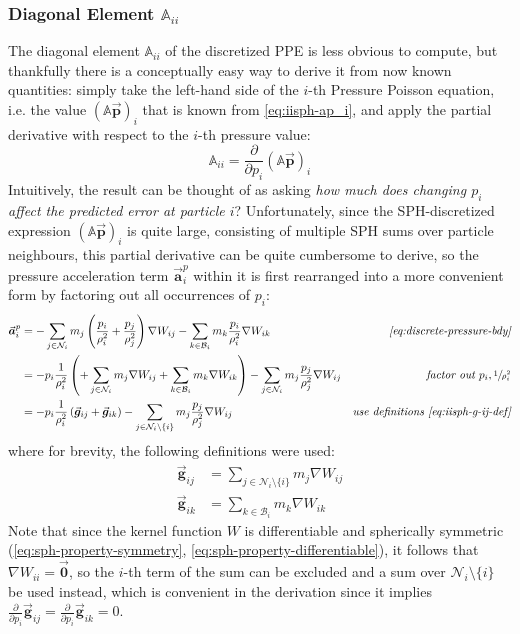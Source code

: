 \documentclass[oneside, a4paper]{book}
\newcommand\pdpi[0]{\frac{\partial}{\partial p_i}}
\newcommand\vek[1]{\vec{\bm{#1}}}
\newcommand\br[1]{\left(#1\right)}
\begin{document}
    \subsubsection{Diagonal Element $\mathds{A}_{ii}$}\label{subsec:diagonal-element}
    The diagonal element $\mathds{A}_{ii}$ of the discretized PPE is less obvious to compute, but thankfully there is a conceptually easy way to derive it from now known quantities: simply take the left-hand side of the $i$-th Pressure Poisson equation, i.e. the value $\br{\mathds{A}\vek{p}}_i$ that is known from \autoref{eq:iisph-ap_i}, and apply the partial derivative with respect to the $i$-th pressure value:
    \begin{equation}
      \mathds{A}_{ii} = \pdpi \br{\mathds{A}\vek{p}}_i
    \end{equation}
    Intuitively, the result can be thought of as asking \textit{how much does changing $p_i$ affect the predicted error at particle $i$}? Unfortunately, since the SPH-discretized expression $\br{\mathds{A}\vek{p}}_i$ is quite large, consisting of multiple SPH sums over particle neighbours, this partial derivative can be quite cumbersome to derive, so the pressure acceleration term $\vek{a}_i^p$ within it is first rearranged into a more convenient form by factoring out all occurrences of $p_i$:
    \begin{align}
      \vek{a}_i^p &= -
      \sum_{j\in\mathcal{N}_i} 
        m_j \br{\frac{p_i}{\rho_i^2} + \frac{p_j}{\rho_j^2}} \nabla W_{ij} 
      -\sum_{k\in\mathcal{B}_i} 
        m_k\frac{p_i}{\rho_i^2} \nabla W_{ik} 
      &\textit{\autoref{eq:discrete-pressure-bdy}}\\
      &= -p_i \frac{1}{\rho_i^2}\br{
        +\sum_{j\in\mathcal{N}_i} 
        m_j \nabla W_{ij} 
        +\sum_{k\in\mathcal{B}_i} 
        m_k \nabla W_{ik} 
      }
      - \sum_{j\in\mathcal{N}_i} 
        m_j\frac{p_j}{\rho_j^2} \nabla W_{ij} 
      &\textit{factor out $p_i, \sfrac{1}{\rho_i^2}$}\\
      \label{eq:iisph-a-i}
      &= -p_i \frac{1}{\rho_i^2}\br{
        \vek{g}_{ij}
        +\vek{g}_{ik}
      }
      - \sum_{j\in\mathcal{N}_i\setminus \{i\}} 
        m_j\frac{p_j}{\rho_j^2} \nabla W_{ij} 
      &\textit{use definitions \autoref{eq:iisph-g-ij-def}}
    \end{align}
    where for brevity, the following definitions were used:
    \begin{align}
      \vek{g}_{ij} &= \sum_{j\in\mathcal{N}_i\setminus \{i\}}m_j \nabla W_{ij}\label{eq:iisph-g-ij-def} \\
      \vek{g}_{ik} &= \sum_{k\in\mathcal{B}_i} m_k \nabla W_{ik}
    \end{align}
    Note that since the kernel function $W$ is differentiable and spherically symmetric (\autoref{eq:sph-property-symmetry}, \autoref{eq:sph-property-differentiable}), it follows that $\nabla W_{ii}=\vek{0}$, so the $i$-th term of the sum can be excluded and a sum over $\mathcal{N}_i\setminus \{i\}$ be used instead, which is convenient in the derivation since it implies $\pdpi \vek{g}_{ij} = \pdpi \vek{g}_{ik} = 0$.
\end{document}
